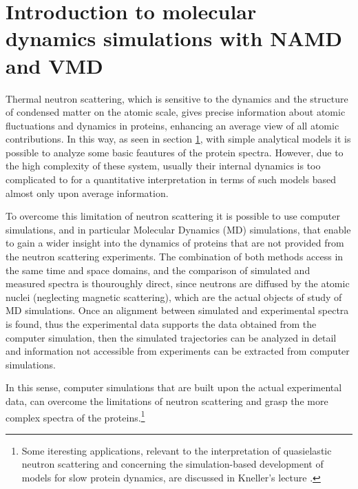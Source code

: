 \chapter{Introduction to molecular dynamics simulations with NAMD and VMD}

Thermal neutron scattering, which is sensitive to the dynamics and the structure of condensed matter on the atomic scale, gives precise information about atomic fluctuations and dynamics in proteins, enhancing an average view of all atomic contributions.
In this way, as seen in section \ref{}, with simple analytical models it is possible to analyze some basic feautures of the protein spectra. However, due to the high complexity of these system, usually their internal dynamics is too complicated to for a quantitative interpretation in terms of such models based almost only upon average information. 

To overcome this limitation of neutron scattering it is possible to use computer simulations, and in particular Molecular Dynamics (MD) simulations, that enable to gain a wider insight into the dynamics of proteins that are not provided from the neutron scattering experiments. The combination of both methods access in the same time and space domains, and the comparison of simulated and measured spectra is thouroughly direct, since neutrons are diffused by the atomic nuclei (neglecting magnetic scattering), which are the actual objects of study of MD simulations. Once an alignment between simulated and experimental spectra is found, thus the experimental data supports the data obtained from the computer simulation, then the simulated trajectories can be analyzed in detail and information not accessible from experiments can be extracted from computer simulations.

In this sense, computer simulations that are built upon the actual experimental data, can overcome the limitations of neutron scattering and grasp the more complex spectra of the proteins.\footnote{Some iteresting applications, relevant to the interpretation of quasielastic neutron scattering and concerning the simulation-based development of models for slow protein dynamics, are discussed in Kneller's lecture \cite{ref:QNS_Keller}.}

